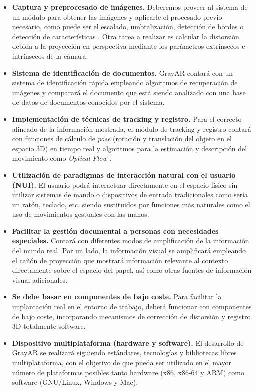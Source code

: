 \begin{itemize}
\item \textbf{Captura y preprocesado de imágenes.} Deberemos proveer al sistema de un módulo para obtener las imágenes y aplicarle el procesado previo necesario, como puede ser el escalado, umbralización, detección de bordes o detección de características \cite{Ortiz} \cite{Bay}. Otra tarea a realizar es calcular la distorsión debida a la proyección en perspectiva mediante los parámetros extrínsecos e intrínsecos de la cámara.

\item \textbf{Sistema de identificación de documentos.} GrayAR contará con un sistema de identificación rápida empleando algoritmos de recuperación de imágenes y comparará el documento que está siendo analizado con una base de datos de documentos conocidos por el sistema.

\item \textbf{Implementación de técnicas de tracking y registro.} Para el correcto alineado de la información mostrada, el módulo de tracking y registro contará con funciones de cálculo de \emph{pose} (rotación y translación del objeto en el espacio 3D) en tiempo real y algoritmos para la estimación y descripción del movimiento como \textit{Optical Flow} \cite{LKanade}.   

\item \textbf{Utilización de paradigmas de interacción natural con el usuario (NUI).} El usuario podrá interactuar directamente en el espacio físico sin utilizar sistemas de mando o dispositivos de entrada tradicionales como sería un ratón, teclado, etc. siendo sustituidos por funciones más naturales como el uso de movimientos gestuales con las manos.

\item \textbf{Facilitar la gestión documental a personas con necesidades especiales.} Contará con diferentes modos de amplificación de la información del mundo real. Por un lado, la información visual se amplificará empleando el cañón de proyección que mostrará información relevante al contexto directamente sobre el espacio del papel, así como otras fuentes de información visual adicionales. 

\item \textbf{Se debe basar en componentes de bajo coste.} Para facilitar la implantación real en el entorno de trabajo, deberá funcionar con componentes de bajo coste, incorporando mecanismos de corrección de distorsión y registro 3D totalmente software.

\item \textbf{Dispositivo multiplataforma (hardware y software).} El desarrollo de GrayAR se realizará siguiendo estándares, tecnologías y bibliotecas libres multiplataforma, con el objetivo de que pueda ser utilizado en el mayor número de plataformas posibles tanto hardware (x86, x86-64 y ARM) como software (GNU/Linux, Windows y Mac).
\end{itemize}


